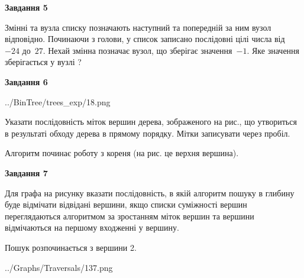 \documentclass[12pt, ukrainian]{article}
\begin{document}
{\begin {large}
{\begin {center}\textbf{Завдання 5}\end {center}}\par
Змінні  та  вузла списку позначають наступний та попередній за ним вузол відповідно. Починаючи з голови, у список записано послідовні цілі числа від~$-24$ до~$27$. Нехай змінна  позначає вузол, що зберігає значення~$-1$.
Яке значення зберігається у вузлі  ?\par
\newpage

{\begin {center}\textbf{Завдання 6}\end {center}}\par

\begin{center}
	{../BinTree/trees_exp/18.png}
\end{center}
Указати послідовність міток вершин дерева, зображеного на рис., що утвориться в результаті обходу дерева в прямому порядку. Мітки записувати через пробіл.\par Алгоритм починає роботу з кореня (на рис. це верхня вершина).\par
\newpage

{\begin {center}\textbf{Завдання 7}\end {center}}\par
Для графа на рисунку вказати послідовність, в якій алгоритм пошуку в глибину буде відмічати відвідані вершини, якщо списки суміжності вершин переглядаються алгоритмом за зростанням міток вершин та вершини відмічаються на першому вход\-женні у вершину.\par
Пошук розпочинається з вершини 2.\par

\begin{center}
	{../Graphs/Traversals/137.png}
\end{center}\par
\newpage


\end{large}}
\end{document}
